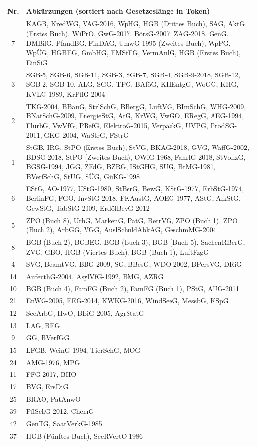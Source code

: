 \begin{tabular}{cp{}}
    \textbf{Nr.} & \textbf{Abkürzungen (sortiert nach Gesetzeslänge in Token)} \\ \hline
7 & KAGB, KredWG, VAG-2016, WpHG, HGB (Drittes Buch), SAG, AktG (Erstes Buch), WiPrO, GwG-2017, BörsG-2007, ZAG-2018, GenG, DMBilG, PfandBG, FinDAG, UmwG-1995 (Zweites Buch), WpPG, WpÜG, HGBEG, GmbHG, FMStFG, VermAnlG, HGB (Erstes Buch), EinSiG \\ \hline
3 & SGB-5, SGB-6, SGB-11, SGB-3, SGB-7, SGB-4, SGB-9-2018, SGB-12, SGB-2, SGB-10, ALG, SGG, TPG, BAföG, KHEntgG, WoGG, KHG, KVLG-1989, KrPflG-2004 \\ \hline
2 & TKG-2004, BBauG, StrlSchG, BBergG, LuftVG, BImSchG, WHG-2009, BNatSchG-2009, EnergieStG, AtG, KrWG, VwGO, ERegG, AEG-1994, FlurbG, VwVfG, PBefG, ElektroG-2015, VerpackG, UVPG, ProdSG-2011, GKG-2004, WaStrG, FStrG \\ \hline
1 & StGB, IRG, StPO (Erstes Buch), StVG, BKAG-2018, GVG, WaffG-2002, BDSG-2018, StPO (Zweites Buch), OWiG-1968, FahrlG-2018, StVollzG, BGSG-1994, JGG, ZFdG, BZRG, IStGHG, SUG, BtMG-1981, BVerfSchG, StUG, SÜG, GüKG-1998 \\ \hline
6 & EStG, AO-1977, UStG-1980, StBerG, BewG, KStG-1977, ErbStG-1974, BerlinFG, FGO, InvStG-2018, FKAustG, AOEG-1977, AStG, AlkStG, GewStG, TabStG-2009, ErdölBevG-2012 \\ \hline
5 & ZPO (Buch 8), UrhG, MarkenG, PatG, BetrVG, ZPO (Buch 1), ZPO (Buch 2), ArbGG, VGG, AuslSchuldAbkAG, GeschmMG-2004 \\ \hline
8 & BGB (Buch 2), BGBEG, BGB (Buch 3), BGB (Buch 5), SachenRBerG, ZVG, GBO, HGB (Viertes Buch), BGB (Buch 1), LuftFzgG \\ \hline
4 & SVG, BeamtVG, BBG-2009, SG, BBesG, WDO-2002, BPersVG, DRiG \\ \hline
14 & AufenthG-2004, AsylVfG-1992, BMG, AZRG \\ \hline
10 & BGB (Buch 4), FamFG (Buch 2), FamFG (Buch 1), PStG, AUG-2011 \\ \hline
21 & EnWG-2005, EEG-2014, KWKG-2016, WindSeeG, MessbG, KSpG \\ \hline
12 & SeeArbG, HwO, BBiG-2005, AgrStatG \\ \hline
13 & LAG, BEG \\ \hline
9 & GG, BVerfGG \\ \hline
15 & LFGB, WeinG-1994, TierSchG, MOG \\ \hline
24 & AMG-1976, MPG \\ \hline
11 & FFG-2017, BHO \\ \hline
17 & BVG, ErsDiG \\ \hline
25 & BRAO, PatAnwO \\ \hline
39 & PflSchG-2012, ChemG \\ \hline
42 & GenTG, SaatVerkG-1985 \\ \hline
37 & HGB (Fünftes Buch), SeeRVertO-1986 \\
    \end{tabular}
    
